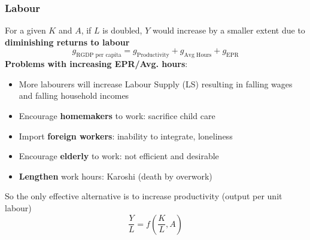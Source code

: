 \documentclass{article}
\begin{document}
\begin{multicols}{2}
\subsubsection{Labour}
For a given $K$ and $A$, if $L$ is doubled, $Y$ would increase by a smaller extent due to \textbf{diminishing returns to labour}
$$g_{\text{RGDP per capita}} = g_{\text{Productivity}} + g_{\text{Avg Hours}} + g_{\text{EPR}}$$
\textbf{Problems with increasing EPR/Avg. hours}:
\begin{itemize}
	\item More labourers will increase Labour Supply (LS) resulting in falling wages and falling household incomes
	\item Encourage \textbf{homemakers} to work: sacrifice child care
	\item Import \textbf{foreign workers}: inability to integrate, loneliness
	\item Encourage \textbf{elderly} to work: not efficient and desirable
	\item \textbf{Lengthen} work hours: Karoshi (death by overwork)
\end{itemize}
So the only effective alternative is to increase productivity (output per unit labour)
$$\frac{Y}{L} = f\left(\frac{K}{L}, A\right)$$


\end{multicols}
\end{document}
